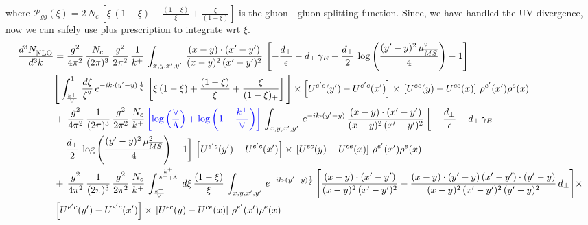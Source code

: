 \documentclass[9pt]{article}
\numberwithin{equation}{section}
\begin{document}
where $\mathcal{P}_{gg}(\xi) = 2\,N_{c}\,\left[\xi\,(1-\xi)+\frac{(1-\xi)}{\xi}+\frac{\xi}{(1-\xi)}\right]$ is the gluon - gluon splitting function. Since, we have handled the UV divergence, now we can safely use plus prescription to integrate wrt $\xi$. 
\begin{align}
    \frac{d^{3}N_{\rm NLO}^{\rm}}{d^{3}k}  & = \frac{g^{2}}{4\pi^{2}}\, \frac{N_{c}}{(2\pi)^{3}}\,\frac{g^{2}}{2\pi^{2}}\, \frac{1}{k^{+}}\,\int_{x,y,x',y'}\,\frac{(x-y)\cdot (x'-y')}{(x-y)^{2}\,(x'-y')^{2}}\,\left[-\frac{d_{\perp}}{\epsilon}-d_{\perp}\,\gamma_{E}-\frac{d_{\perp}}{2}\,\log{\left(\frac{(y'-y)^{2}\,\mu^{2}_{\overline{MS}}}{4}\right)}-1\right]\,\notag \\ & \Bigg[\int_{\frac{k^{+}}{\vee}}^{1}\,\frac{d\xi}{\xi^{2}}\,e^{-ik\cdot (y'-y)\,\frac{1}{\xi}}\,\left[\xi\,(1-\xi)+\frac{(1-\xi)}{\xi}+\frac{\xi}{(1-\xi)_{+}}\right]\Bigg]\times \left[U^{e'c}(y') - U^{e'c}(x')\right] \times\, \left[U^{ec}(y) - U^{ce}(x)\right]\, \rho^{e'}(x') \rho^{e}(x)\notag \\ &  +\, \frac{g^{2}}{4\pi^{2}}\, \frac{1}{(2\pi)^{3}}\,\frac{g^{2}}{2\pi^{2}}\, \frac{N_{c}}{k^{+}}\,{\color{blue}\left[\log{\left(\frac{\vee}{\Lambda}\right)} + \log{\left(1-\frac{k^{+}}{\vee}\right)} \right]}\,\int_{x,y,x',y'}\,e^{-ik\cdot (y'-y)}\,\frac{(x-y)\cdot (x'-y')}{(x-y)^{2}\,(x'-y')^{2}}\,\bigg[-\frac{d_{\perp}}{\epsilon}-d_{\perp}\,\gamma_{E}\notag \\ & -\frac{d_{\perp}}{2}\,\log{\left(\frac{(y'-y)^{2}\,\mu^{2}_{\overline{MS}}}{4}\right)}-1\bigg]\,\left[U^{e'c}(y') - U^{e'c}(x')\right] \times\, \left[U^{ec}(y) - U^{ce}(x)\right]\, \rho^{e'}(x') \rho^{e}(x)\notag \\ & +\,\frac{g^{2}}{4\pi^{2}}\, \frac{1}{(2\pi)^{3}}\,\frac{g^{2}}{2\pi^{2}}\, \frac{N_{c}}{k^{+}}\,\int_{\frac{k^{+}}{\vee}}^{\frac{k^{+}}{k^{+}+\Lambda}}\,d\xi\, \frac{(1-\xi)}{\xi}\, \int_{x,y,x',y'}\,e^{-ik\cdot (y'-y)\frac{1}{\xi}}\,\Bigg[\frac{(x-y)\cdot (x'-y')}{(x-y)^{2}\, (x'-y')^{2}} -\frac{(x-y)\cdot (y'-y)\, (x'-y')\cdot (y'-y)}{(x-y)^{2}\,(x'-y')^{2}\,(y'-y)^{2}}\,d_{\perp}\Bigg]\times\notag \\ &  \left[U^{e'c}(y') - U^{e'c}(x')\right] \times\, \left[U^{ec}(y) - U^{ce}(x)\right]\, \rho^{e'}(x') \rho^{e}(x)
\end{align}
\end{document}
